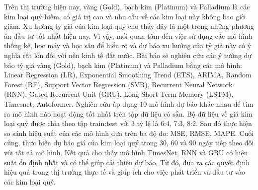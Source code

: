 Trên thị trường hiện nay, vàng (Gold), bạch kim (Platinum) và Palladium là các kim loại quý hiếm, có giá trị cao và nhu cầu về các kim loại này không bao giờ giảm. Xu hướng tỷ giá của kim loại quý cho thấy đây là một trong những phương án đầu tư tốt nhất hiện nay. Vì vậy, mối quan tâm đến việc sử dụng các mô hình thống kê, học máy và học sâu để hiểu rõ và dự báo xu hướng của tỷ giá này có ý nghĩa rất lớn đối với nền kinh tế đất nước. Bài báo sẽ nghiên cứu các ý tưởng dự báo tỷ giá vàng (Gold), bạch kim (Platinum) và Palladium bằng các mô hình: Linear Regression (LR), Exponential Smoothing Trend (ETS), ARIMA, Random Forest (RF), Support Vector Regression (SVR), Recurrent Neural Network (RNN), Gated Recurrent Unit  (GRU), Long Short Term Memory (LSTM), Timesnet, Autoformer. Nghiên cứu áp dụng 10 mô hình dự báo khác nhau để tìm ra mô hình nào hoạt động tốt nhất trên tập dữ liệu có sẵn. Bộ dữ liệu về giá kim loại quý được chia theo tập train:test với 3 tỷ lệ là 6:4, 7:3, 8:2. Sau đó thực hiện so sánh hiệu suất của các mô hình dựa trên ba độ đo: MSE, RMSE, MAPE. Cuối cùng, thực hiện dự báo giá của kim loại quý trong 30, 60 và 90 ngày tiếp theo đối với tất cả mô hình. Kết quả cho thấy mô hình TimesNet, RNN và GRU có hiệu suất ổn định nhất và có thể giúp cải thiện dự báo. Từ đó, đưa ra các quyết định hiệu quả trong thị trường thực tế và giúp ích cho việc phát triển và đầu tư vào các kim loại quý.